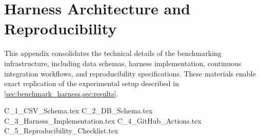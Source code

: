 \section{Harness Architecture and Reproducibility}
\label{app:harness_reproducibility}

This appendix consolidates the technical details of the benchmarking infrastructure, including data schemas, harness implementation, continuous integration workflows, and reproducibility specifications. These materials enable exact replication of the experimental setup described in \cref{sec:benchmark_harness,sec:results}.

{C_1_CSV_Schema.tex}
{C_2_DB_Schema.tex}
{C_3_Harness_Implementation.tex}
{C_4_GitHub_Actions.tex}
{C_5_Reproducibility_Checklist.tex}
